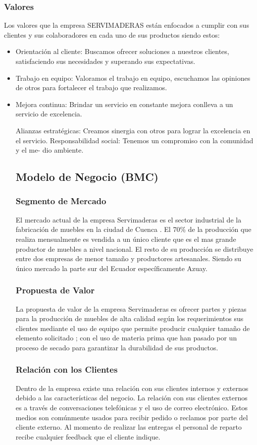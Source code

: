 \documentclass[12pt, a4paper]{article}
\begin{document}
\subsubsection{Valores}
Los valores que la empresa SERVIMADERAS están enfocados a cumplir con sus clientes y sus colaboradores en cada uno de sus productos siendo estos:
\begin{itemize}
	\item Orientación al cliente: Buscamos ofrecer soluciones a nuestros clientes, satisfaciendo sus necesidades y superando sus expectativas.
	\item Trabajo en equipo: Valoramos el trabajo en equipo, escuchamos las opiniones de otros para fortalecer el trabajo que realizamos.
	\item Mejora continua: Brindar un servicio en constante mejora conlleva a un servicio de excelencia.

   
Alianzas estratégicas: Creamos sinergia con otros para lograr la excelencia en el servicio.
Responsabilidad social: Tenemos un compromiso con la comunidad y el me- dio ambiente.

\subsection{Modelo de Negocio (BMC)}	
\subsubsection{Segmento de Mercado}
El mercado actual de la empresa Servimaderas es el sector industrial de la fabricación de muebles en la ciudad de Cuenca . El 70\% de la producción  que realiza mensualmente es vendida a un único cliente que es el mas grande productor de muebles a nivel nacional. El resto de su producción se distribuye entre dos empresas de menor tamaño y productores artesanales. Siendo su único mercado la parte sur del Ecuador específicamente Azuay.
\subsubsection{Propuesta de Valor}
La propuesta de valor de la empresa Servimaderas es ofrecer partes y piezas para la producción de muebles de alta calidad según los requerimientos sus clientes mediante el uso de equipo que permite producir cualquier tamaño de elemento solicitado ; con el uso de materia prima que han pasado por un proceso de secado para garantizar la durabilidad de sus productos.
\subsubsection{Relación con los Clientes}
Dentro de la empresa existe una relación con sus clientes internos y externos debido a las características del negocio. La relación con sus clientes externos es a través de conversaciones telefónicas y el uso de correo electrónico. Estos medios son comúnmente usados para recibir pedido o reclamos por parte del cliente externo. Al momento de realizar las entregas el personal de reparto  recibe cualquier feedback que el cliente indique.


\end{itemize}
\end{document}
